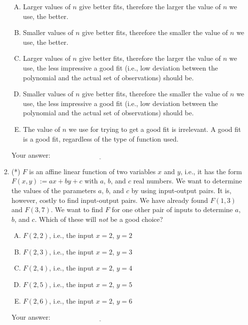 \documentclass[10pt]{amsart}
\begin{document}
\begin{enumerate}
  \begin{enumerate}[(A)]
  \item Larger values of $n$ give better fits, therefore the larger
    the value of $n$ we use, the better.
  \item Smaller values of $n$ give better fits, therefore the smaller
    the value of $n$ we use, the better.
  \item Larger values of $n$ give better fits, therefore the larger
    the value of $n$ we use, the less impressive a good fit (i.e., low
    deviation between the polynomial and the actual set of
    observations) should be.
  \item Smaller values of $n$ give better fits, therefore the smaller
    the value of $n$ we use, the less impressive a good fit (i.e., low
    deviation between the polynomial and the actual set of
    observations) should be.
  \item The value of $n$ we use for trying to get a good fit is
    irrelevant. A good fit is a good fit, regardless of the type of
    function used.
  \end{enumerate}

  \vspace{0.1in}
  Your answer: $\underline{\qquad\qquad\qquad\qquad\qquad\qquad\qquad}$
  \vspace{0.6in}

\item (*) $F$ is an affine linear function of two variables $x$ and
  $y$, i.e., it has the form $F(x,y) := ax + by + c$ with $a$, $b$,
  and $c$ real numbers. We want to determine the values of the
  parameters $a$, $b$, and $c$ by using input-output pairs. It is,
  however, costly to find input-output pairs. We have already found
  $F(1,3)$ and $F(3,7)$. We want to find $F$ for one other pair of
  inputs to determine $a$, $b$, and $c$. Which of these will {\em not}
  be a good choice?

  \begin{enumerate}[(A)]
  \item $F(2,2)$, i.e., the input $x = 2$, $y = 2$
  \item $F(2,3)$, i.e., the input $x = 2$, $y = 3$
  \item $F(2,4)$, i.e., the input $x = 2$, $y = 4$
  \item $F(2,5)$, i.e., the input $x = 2$, $y = 5$
  \item $F(2,6)$, i.e., the input $x = 2$, $y = 6$
  \end{enumerate}

  \vspace{0.1in}
  Your answer: $\underline{\qquad\qquad\qquad\qquad\qquad\qquad\qquad}$
  \vspace{0.6in}
\end{enumerate}
\end{document}
